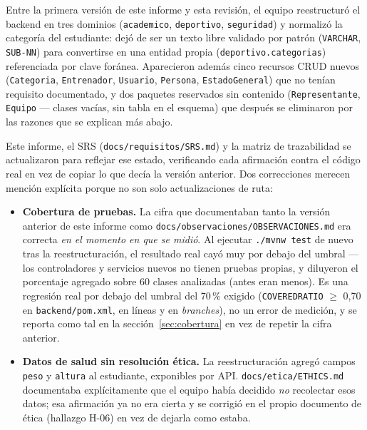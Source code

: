 \documentclass[11pt,a4paper]{article}
\begin{document}
Entre la primera versión de este informe y esta revisión, el equipo
reestructuró el backend en tres dominios (\texttt{academico}, \texttt{deportivo},
\texttt{seguridad}) y normalizó la categoría del estudiante: dejó de ser un
texto libre validado por patrón (\texttt{VARCHAR}, \texttt{SUB-NN}) para
convertirse en una entidad propia (\texttt{deportivo.categorias}) referenciada
por clave foránea. Aparecieron además cinco recursos CRUD nuevos
(\texttt{Categoria}, \texttt{Entrenador}, \texttt{Usuario}, \texttt{Persona},
\texttt{EstadoGeneral}) que no tenían requisito documentado, y dos paquetes
reservados sin contenido (\texttt{Representante}, \texttt{Equipo} — clases
vacías, sin tabla en el esquema) que después se eliminaron por las razones
que se explican más abajo.

Este informe, el SRS (\texttt{docs/requisitos/SRS.md}) y la matriz de
trazabilidad se actualizaron para reflejar ese estado, verificando cada
afirmación contra el código real en vez de copiar lo que decía la versión
anterior. Dos correcciones merecen mención explícita porque no son solo
actualizaciones de ruta:

\begin{itemize}[leftmargin=*]
  \item \textbf{Cobertura de pruebas.} La cifra que documentaban
    tanto la versión anterior de este informe como
    \texttt{docs/observaciones/OBSERVACIONES.md} era correcta \emph{en el
    momento en que se midió}. Al ejecutar \texttt{./mvnw test} de nuevo tras
    la reestructuración, el resultado real cayó muy por debajo del umbral —
    los controladores y servicios nuevos no tienen pruebas propias, y
    diluyeron el porcentaje agregado sobre 60 clases analizadas (antes
    eran menos). Es una regresión real por debajo del umbral del 70\,\% exigido
    (\texttt{COVEREDRATIO} $\geq$ 0,70 en \texttt{backend/pom.xml}, en
    líneas y en \emph{branches}), no un error de medición, y se reporta
    como tal en la sección~\ref{sec:cobertura} en vez de repetir la cifra
    anterior.
  \item \textbf{Datos de salud sin resolución ética.} La reestructuración
    agregó campos \texttt{peso} y \texttt{altura} al estudiante, exponibles
    por API. \texttt{docs/etica/ETHICS.md} documentaba explícitamente que el
    equipo había decidido \emph{no} recolectar esos datos; esa afirmación ya
    no era cierta y se corrigió en el propio documento de ética (hallazgo
    H-06) en vez de dejarla como estaba.
\end{itemize}
\end{document}
